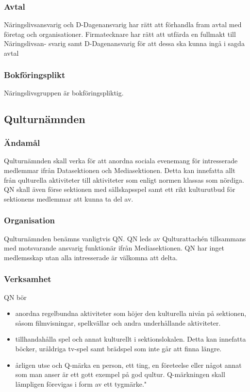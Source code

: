 \documentclass{dgovdoc}
\begin{document}
\subsubsection{Avtal}

Näringslivsansvarig och D-Dagenansvarig har rätt att förhandla fram avtal med företag
och organisationer. Firmatecknare har rätt att utfärda en fullmakt till Näringslivsan-
svarig samt D-Dagenansvarig för att dessa ska kunna ingå i sagda avtal

\subsubsection{Bokföringsplikt}
Näringslivsgruppen är bokföringspliktig.

\subsection{Qulturnämnden}

\subsubsection{Ändamål}

Qulturnämnden skall verka för att anordna sociala evenemang för intresserade medlemmar ifrån Datasektionen och Mediasektionen. Detta kan innefatta allt från qulturella aktiviteter till aktiviteter som enligt normen klassas som nördiga. QN skall även förse sektionen med sällskapsspel samt ett rikt kulturutbud för sektionens medlemmar att kunna ta del av.

\subsubsection{Organisation}

Qulturnämnden benämns vanligtvis QN. QN leds av Qulturattachén tillsammans med motsvarande ansvarig funktionär ifrån Mediasektionen. QN har inget medlemsskap utan alla intresserade är välkomna att delta.

\subsubsection{Verksamhet}

QN bör
\begin{itemize}
  \item anordna regelbundna aktiviteter som höjer den kulturella nivån på sektionen, såsom filmvisningar, spelkvällar och andra underhållande aktiviteter.
  \item tillhandahålla spel och annat kulturellt i sektionslokalen. Detta kan innefatta böcker, uråldriga tv-spel samt brädspel som inte går att finna längre.
  \item årligen utse och Q-märka en person, ett ting, en företeelse eller något annat som man anser är ett gott exempel på god qultur. Q-märkningen skall lämpligen förevigas i form av ett tygmärke."
\end{itemize}
\end{document}
